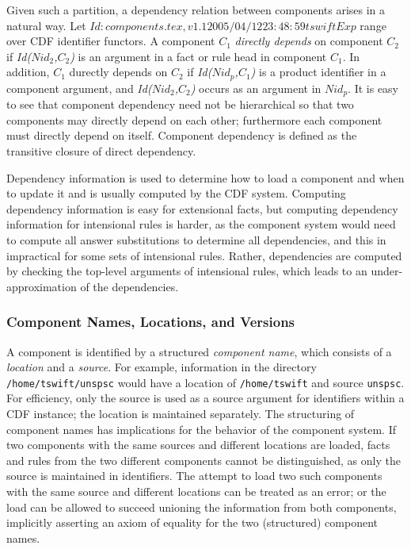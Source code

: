 Given such a partition, a dependency relation between components
arises in a natural way.  Let $Id: components.tex,v 1.1 2005/04/12 23:48:59 tswift Exp $ range over CDF identifier functors.
A component $C_1$ {\em directly depends} on component $C_2$ if {\em
Id($Nid_2$,$C_2$)} is an argument in a fact or rule head in component
$C_1$.  In addition, $C_1$ durectly depends on $C_2$ if {\em
Id($Nid_p$,$C_1$)} is a product identifier in a component argument,
and {\em Id($Nid_2$,$C_2$)} occurs as an argument in $Nid_p$.  It is
easy to see that component dependency need not be hierarchical so that
two components may directly depend on each other; furthermore each
component must directly depend on itself.  Component dependency is
defined as the transitive closure of direct dependency.

Dependency information is used to determine how to load a component
and when to update it and is usually computed by the CDF system.
Computing dependency information is easy for extensional facts, but
computing dependency information for intensional rules is harder, as
the component system would need to compute all answer substitutions to
determine all dependencies, and this in impractical for some sets of
intensional rules.  Rather, dependencies are computed by checking the
top-level arguments of intensional rules, which leads to an
under-approximation of the dependencies.

\subsubsection{Component Names, Locations, and Versions}

A component is identified by a structured {\em component name}, which
consists of a {\em location} and a {\em source}.  For example,
information in the directory {\tt /home/tswift/unspsc} would have a
location of {\tt /home/tswift} and source {\tt unspsc}.  For
efficiency, only the source is used as a source argument for
identifiers within a CDF instance; the location is maintained
separately.  The structuring of component names has implications for
the behavior of the component system.  If two components with the same
sources and different locations are loaded, facts and rules from the
two different components cannot be distinguished, as only the source
is maintained in identifiers.  The attempt to load two such components
with the same source and different locations can be treated as an
error; or the load can be allowed to succeed unioning the information
from both components, implicitly asserting an axiom of equality for
the two (structured) component names.

